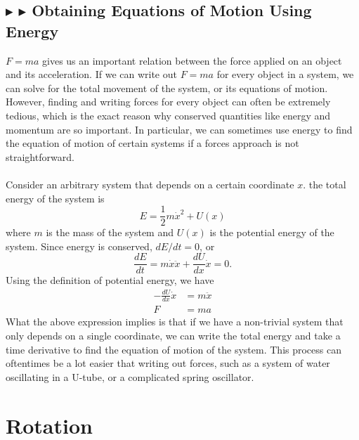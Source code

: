 \subsection{\color{Goldenrod} $\blacktriangleright$ \color{Orchid} $\blacktriangleright$ \color{black} Obtaining Equations of Motion Using Energy}
$F=ma$ gives us an important relation between the force applied on an object and its acceleration. If we can write out $F=ma$ for every object in a system, we can solve for the total movement of the system, or its equations of motion. However, finding and writing forces for every object can often be extremely tedious, which is the exact reason why conserved quantities like energy and momentum are so important. In particular, we can sometimes use energy to find the equation of motion of certain systems if a forces approach is not straightforward. \\
\\
\noindent Consider an arbitrary system that depends on a certain coordinate $x$. the total energy of the system is
\begin{equation}
    E = \frac12 m\dot{x}^2 + U(x)
\end{equation}
\noindent where $m$ is the mass of the system and $U(x)$ is the potential energy of the system. Since energy is conserved, $dE/dt = 0$, or 
\begin{equation*}
    \frac{dE}{dt} = m\dot{x}\ddot{x} + \frac{dU}{dx}\dot{x} = 0.
\end{equation*}
\noindent Using the definition of potential energy, we have
\begin{align*}
    -\frac{dU}{dx}\dot{x} &= m\ddot{x} \\
    F &= ma
\end{align*}
\noindent What the above expression implies is that if we have a non-trivial system that only depends on a single coordinate, we can write the total energy and take a time derivative to find the equation of motion of the system. This process can oftentimes be a lot easier that writing out forces, such as a system of water oscillating in a U-tube, or a complicated spring oscillator.

\clearpage
\section{Rotation}
